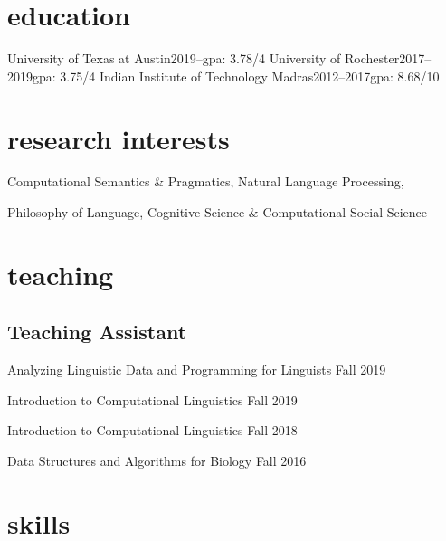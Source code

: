 \documentclass[10pt,a4paper]{mycv}
\begin{document}
\cfoot{\sansc \thepage}
\makecvtitle


\section{education}
    {University of Texas at Austin}{2019--}{\rmsc gpa: 3.78/4}{}
    {University of Rochester}{2017--2019}{\rmsc gpa: 3.75/4}{}
    {Indian Institute of Technology Madras}{2012--2017}{\rmsc gpa: 8.68/10}{}

\section{research interests}

{\large Computational Semantics \& Pragmatics, Natural Language Processing,

\vspace{0.5ex}

Philosophy of Language, Cognitive Science \& Computational Social Science}


\begingroup
\setlength\bibitemsep{2ex}
\printbibliography[title={\sansc papers}, nottype=unpublished]
\endgroup

\begingroup
\setlength\bibitemsep{2ex}
\printbibliography[title={\sansc talks}, type=unpublished]
\endgroup


\section{teaching}

\subsection{Teaching Assistant}

Analyzing Linguistic Data and Programming for Linguists \hfill Fall 2019

Introduction to Computational Linguistics \hfill Fall 2019

Introduction to Computational Linguistics \hfill Fall 2018

Data Structures and Algorithms for Biology \hfill Fall 2016

\section{skills}
\end{document}
